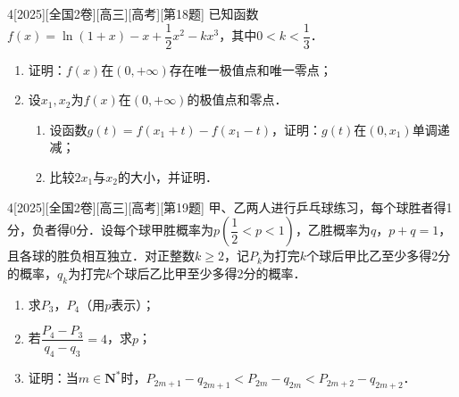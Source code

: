 \begin{example}{4}[2025][全国2卷][高三][高考][第18题]
已知函数$f(x)=\ln(1+x)-x+\dfrac{1}{2}x^2-kx^3$，其中$0<k<\dfrac{1}{3}$．
\begin{enumerate}
    \item 证明：$f(x)$在$(0,+\infty)$存在唯一极值点和唯一零点；
    \item 设$x_1,x_2$为$f(x)$在$(0,+\infty)$的极值点和零点．
    \begin{enumerate}
        \item 设函数$g(t)=f(x_1+t)-f(x_1-t)$，证明：$g(t)$在$(0,x_1)$单调递减；
        \item 比较$2x_1$与$x_2$的大小，并证明．
    \end{enumerate}
\end{enumerate}
\end{example}

\begin{example}{4}[2025][全国2卷][高三][高考][第19题]
甲、乙两人进行乒乓球练习，每个球胜者得1分，负者得0分．设每个球甲胜概率为$p\left(\dfrac{1}{2}<p<1\right)$，乙胜概率为$q$，$p+q=1$，且各球的胜负相互独立．对正整数$k\ge 2$，记$P_k$为打完$k$个球后甲比乙至少多得2分的概率，$q_k$为打完$k$个球后乙比甲至少多得2分的概率．
\begin{enumerate}
    \item 求$P_3$，$P_4$（用$p$表示）；
    \item 若$\dfrac{P_4-P_3}{q_4-q_3}=4$，求$p$；
    \item 证明：当$m\in \mathbf{N}^*$时，$P_{2m+1}-q_{2m+1}<P_{2m}-q_{2m}<P_{2m+2}-q_{2m+2}$．
\end{enumerate}
\end{example}